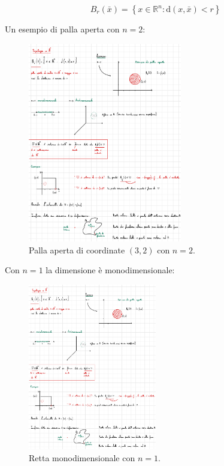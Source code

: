 \documentclass[a4paper]{article}
\begin{document}
	\begin{equation*}
		B_{r}\left(\bar{x}\right) = \left\{x \in \mathbb{R}^{n} : \mathrm{d}\left(x,\bar{x}\right) < r\right\}
	\end{equation*}

	\noindent
	Un esempio di palla aperta con $n = 2$:
	
	\begin{figure}[!htp]
		\centering
		\includegraphics[width=0.6\textwidth]{img/palla_aperta.pdf}
		\caption{Palla aperta di coordinate $\left(3,2\right)$ con $n = 2$.}
	\end{figure}

	\noindent
	Con $n = 1$ la dimensione è monodimensionale:
	
	\begin{figure}[!htp]
		\centering
		\includegraphics[width=0.5\textwidth]{img/monodimensionale.pdf}
		\caption{Retta monodimensionale con $n = 1$.}
	\end{figure}
\end{document}
